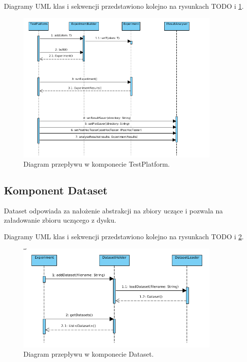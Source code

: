 \documentclass[12pt]{article}
\begin{document}
Diagramy UML klas i sekwencji przedstawiono kolejno na rysunkach TODO i \ref{fig:sequenceTestPlatform}.

\begin{figure}
\centering
	\includegraphics[width=0.9\textwidth]{img/sequenceTestPlatform.png}
	\caption{Diagram przepływu w komponecie TestPlatform.}
	\label{fig:sequenceTestPlatform}
\end{figure}

\subsection{Komponent Dataset}

Dataset odpowiada za nałożenie abstrakcji na zbiory uczące i pozwala na załadowanie zbioru uczącego z dysku. 

Diagramy UML klas i sekwencji przedstawiono kolejno na rysunkach TODO i \ref{fig:sequenceDataset}.

\begin{figure}
	\centering
	\includegraphics[width=0.9\textwidth]{img/sequenceDataset.png}
	\caption{Diagram przepływu w komponecie Dataset.}
	\label{fig:sequenceDataset}
\end{figure}
\end{document}
